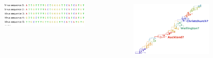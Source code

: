 \documentclass{beamer}
\begin{document}
\begin{frame}

\begin{columns}[c] %





\begin{figure}
\includegraphics[width=0.9\linewidth]{FluSequence0.png}
\end{figure}
\begin{figure}
\includegraphics[width=0.9\linewidth]{InfluenzaTree0.png}
\end{figure}
\end{columns}

\end{frame}
\end{document}
